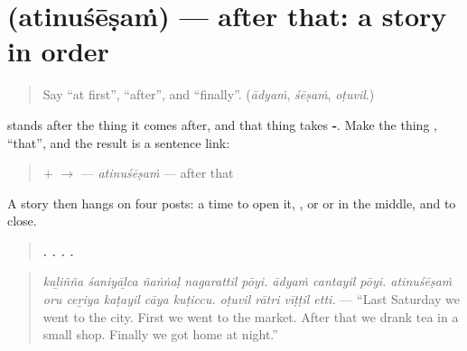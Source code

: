 \section[\texorpdfstring{\ml{അതിനുശേഷം} (atinuśēṣaṁ)}{അതിനുശേഷം (atinuśēṣaṁ)}]{ (atinuśēṣaṁ) — after that: a story in order}

\label{lesson:ML-C340-atinusesham}



\begin{quote}
Say \textquotedblleft{}at first\textquotedblright{}, \textquotedblleft{}after\textquotedblright{}, and \textquotedblleft{}finally\textquotedblright{}. (\emph{ādyaṁ}, \emph{śēṣaṁ}, \emph{oṭuvil}.)
\end{quote}

\begin{grammarlens}[title={Grammar Lens: \ml{അതിനുശേഷം}}]
\textbf{} stands after the thing it comes after, and that thing takes \textbf{-}. Make the thing \textbf{}, \textquotedblleft{}that\textquotedblright{}, and the result is a sentence link:

\begin{quote}
 +  $\to$ \textbf{} — \emph{atinuśēṣaṁ} — after that
\end{quote}

A story then hangs on four posts: a time to open it, \textbf{}, \textbf{} or \textbf{} or \textbf{} in the middle, and \textbf{} to close.

\begin{quote}
\textbf{    .   .      .    .}
\end{quote}

\begin{quote}
\emph{kaḻiñña śaniyāḻca ñaṅṅaḷ nagarattil pōyi. ādyaṁ cantayil pōyi. atinuśēṣaṁ oru ceṟiya kaṭayil cāya kuṭiccu. oṭuvil rātri vīṭṭil etti.} — \textquotedblleft{}Last Saturday we went to the city. First we went to the market. After that we drank tea in a small shop. Finally we got home at night.\textquotedblright{}
\end{quote}
\end{grammarlens}

